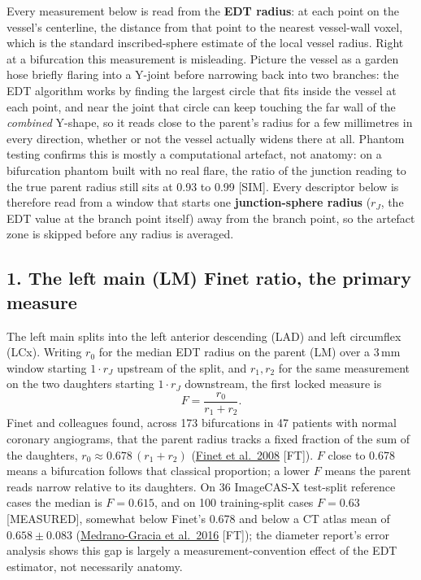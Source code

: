 \documentclass[11pt]{article}
\begin{document}
Every measurement below is read from the \textbf{EDT radius}: at each point on the vessel's
centerline, the distance from that point to the nearest vessel-wall voxel, which is the standard
inscribed-sphere estimate of the local vessel radius. Right at a bifurcation this measurement is
misleading. Picture the vessel as a garden hose briefly flaring into a Y-joint before narrowing back
into two branches: the EDT algorithm works by finding the largest circle that fits inside the vessel
at each point, and near the joint that circle can keep touching the far wall of the \emph{combined}
Y-shape, so it reads close to the parent's radius for a few millimetres in every direction, whether
or not the vessel actually widens there at all. Phantom testing confirms this is mostly a
computational artefact, not anatomy: on a bifurcation phantom built with no real flare, the ratio of
the junction reading to the true parent radius still sits at 0.93 to 0.99 [SIM]. Every
descriptor below is therefore read from a window that starts one \textbf{junction-sphere radius}
($r_J$, the EDT value at the branch point itself) away from the branch point, so the artefact zone is
skipped before any radius is averaged.

\subsection*{1. The left main (LM) Finet ratio, the primary measure}

The left main splits into the left anterior descending (LAD) and left circumflex (LCx). Writing
$r_0$ for the median EDT radius on the parent (LM) over a 3\,mm window starting $1{\cdot}r_J$
upstream of the split, and $r_1, r_2$ for the same measurement on the two daughters starting
$1{\cdot}r_J$ downstream, the first locked measure is
\begin{equation}
  F = \frac{r_0}{r_1 + r_2} .
  \label{eq:finet}
\end{equation}
Finet and colleagues found, across 173 bifurcations in 47 patients with normal coronary
angiograms, that the parent radius tracks a fixed fraction of the sum of the daughters,
$r_0 \approx 0.678\,(r_1+r_2)$
(\href{https://eurointervention.pcronline.com/article/fractal-geometry-of-arterial-coronary-bifurcations-a-quantitative-coronary-angiography-and-intravascular-ultrasound-analysis}{Finet
et al.\ 2008} [FT]). $F$ close to 0.678 means a bifurcation follows that classical proportion; a
lower $F$ means the parent reads narrow relative to its daughters. On 36 ImageCAS-X test-split
reference cases the median is $F=0.615$, and on 100 training-split cases $F=0.63$
[MEASURED], somewhat below Finet's 0.678 and below a CT atlas mean of $0.658\pm0.083$
(\href{https://doi.org/10.4244/EIJV12I7A139}{Medrano-Gracia et al.\ 2016} [FT]); the diameter report's error analysis shows this gap is largely a
measurement-convention effect of the EDT estimator, not necessarily anatomy.
\end{document}
